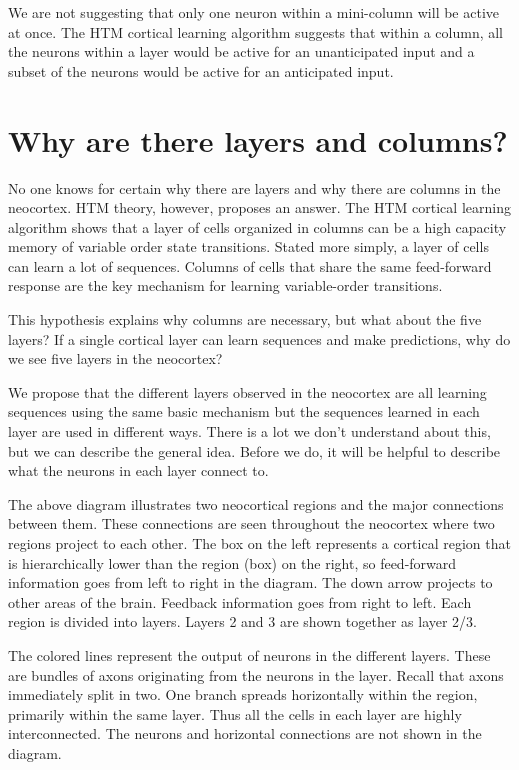 \documentclass{report}
\begin{document}
We are not suggesting that only one neuron within a mini-column will
be active at once. The HTM cortical learning algorithm suggests that
within a column, all the neurons within a layer would be active for an
unanticipated input and a subset of the neurons would be active for an
anticipated input.

\section*{Why are there layers and columns?}

No one knows for certain why there are layers and why there are
columns in the neocortex. HTM theory, however, proposes an answer. The
HTM cortical learning algorithm shows that a layer of cells organized
in columns can be a high capacity memory of variable order state
transitions. Stated more simply, a layer of cells can learn a lot of
sequences. Columns of cells that share the same feed-forward response
are the key mechanism for learning variable-order transitions.

This hypothesis explains why columns are necessary, but what about the
five layers? If a single cortical layer can learn sequences and make
predictions, why do we see five layers in the neocortex?

We propose that the different layers observed in the neocortex are all
learning sequences using the same basic mechanism but the sequences
learned in each layer are used in different ways. There is a lot we
don't understand about this, but we can describe the general
idea. Before we do, it will be helpful to describe what the neurons in
each layer connect to.

\begin{figure}
\end{figure}

The above diagram illustrates two neocortical regions and the major
connections between them. These connections are seen throughout the
neocortex where two regions project to each other. The box on the left
represents a cortical region that is hierarchically lower than the
region (box) on the right, so feed-forward information goes from left
to right in the diagram. The down arrow projects to other areas of the
brain. Feedback information goes from right to left. Each region is
divided into layers. Layers 2 and 3 are shown together as layer 2/3.

The colored lines represent the output of neurons in the different
layers. These are bundles of axons originating from the neurons in the
layer. Recall that axons immediately split in two. One branch spreads
horizontally within the region, primarily within the same layer. Thus
all the cells in each layer are highly interconnected. The neurons and
horizontal connections are not shown in the diagram.
\end{document}
